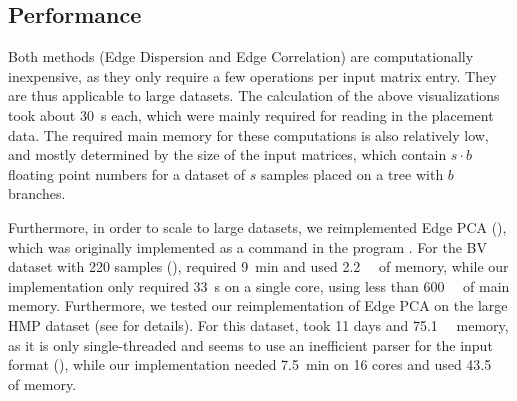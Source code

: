 \subsection{Performance}
\label{ch:Visualization:sec:Results:sub:Performance}

Both methods (Edge Dispersion and Edge Correlation) are computationally inexpensive,
as they only require a few operations per input matrix entry.
They are thus applicable to large datasets.
The calculation of the above visualizations took about \SI{30}{\second} each,
which were mainly required for reading in the placement data.
The required main memory for these computations is also relatively low,
and mostly determined by the size of the input matrices,
which contain $s \cdot b$ floating point numbers for a dataset of $s$ samples placed on a tree with $b$ branches.

Furthermore, in order to scale to large datasets, we reimplemented Edge PCA
(),
which was originally implemented as a command in the  program \cite{Matsen2010}.
For the \ac{BV} dataset with \num{220} samples (),
 required \SI{9}{\minute} and used \SI{2.2}{\giga\byte} of memory,
while our implementation only required \SI{33}{\second} on a single core, using less than \SI{600}{\mega\byte} of main memory.
Furthermore, we tested our reimplementation of Edge PCA on the large \acf{HMP} dataset
(see  for details).
For this dataset,  took \num{11} days and \SI{75.1}{\giga\byte} memory,
as it is only single-threaded and seems to use an inefficient parser for the  input format
(),
while our implementation needed \SI{7.5}{\minute} on \num{16} cores and used \SI{43.5}{\giga\byte} of memory.



%

